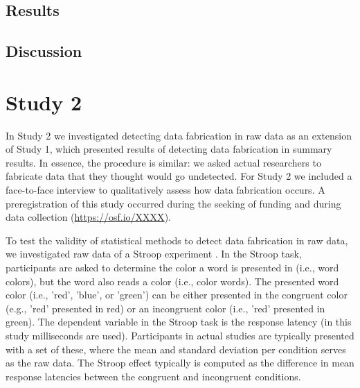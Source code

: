 \documentclass{article}
\begin{document}
\subsection*{Results}



\subsection*{Discussion}







\section*{Study 2}

In Study 2 we investigated detecting data fabrication in raw data as an extension of Study 1, which presented results of detecting data fabrication in summary results. In essence, the procedure is similar: we asked actual researchers to fabricate data that they thought would go undetected. For Study 2 we included a face-to-face interview to qualitatively assess how data fabrication occurs. A preregistration of this study occurred during the seeking of funding \citep{10.3897/rio.2.e8860} and during data collection (\url{https://osf.io/XXXX}).

To test the validity of statistical methods to detect data fabrication in raw data, we investigated raw data of a Stroop experiment \citep{Stroop_1935}. In the Stroop task, participants are asked to determine the color a word is presented in (i.e., word colors), but the word also reads a color (i.e., color words). The presented word color (i.e., 'red', 'blue', or 'green') can be either presented in the congruent color (e.g., 'red' presented in red) or an incongruent color (i.e., 'red' presented in green). The dependent variable in the Stroop task is the response latency (in this study milliseconds are used). Participants in actual studies are typically presented with a set of these, where the mean and standard deviation per condition serves as the raw data. The Stroop effect typically is computed as the difference in mean response latencies between the congruent and incongruent conditions.
\end{document}
